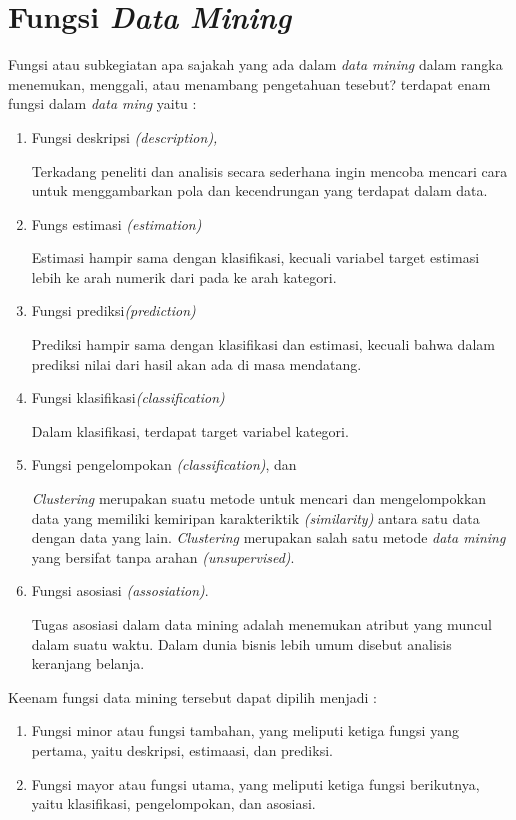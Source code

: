 \section{Fungsi \textit{Data Mining}}
\par Fungsi atau subkegiatan apa sajakah yang ada dalam \textit{data mining} dalam rangka menemukan, menggali, atau menambang pengetahuan tesebut? terdapat enam fungsi dalam \textit{data ming} yaitu : \cite{tampubolon2013implementasi}
\begin{enumerate}
    \item Fungsi deskripsi \textit{(description),}
    \par Terkadang peneliti dan analisis secara sederhana ingin mencoba mencari cara untuk menggambarkan pola dan kecendrungan yang terdapat dalam data.
     \item Fungs estimasi \textit{(estimation)}
     \par Estimasi hampir sama dengan klasifikasi, kecuali variabel target estimasi lebih ke arah numerik dari pada ke arah kategori. 
      \item Fungsi prediksi\textit{(prediction)}
      \par Prediksi hampir sama dengan klasifikasi dan estimasi, kecuali bahwa dalam prediksi nilai dari hasil akan ada di masa mendatang. 
       \item Fungsi klasifikasi\textit{(classification)}
       \par Dalam klasifikasi, terdapat target variabel kategori. 
        \item  Fungsi pengelompokan \textit{(classification)}, dan
       \par  \textit{Clustering} merupakan suatu metode untuk mencari dan mengelompokkan data yang memiliki kemiripan karakteriktik \textit{(similarity)} antara satu data dengan data yang lain. \textit{Clustering} merupakan salah satu metode \textit{data mining} yang bersifat tanpa arahan \textit{(unsupervised)}.
         \item Fungsi asosiasi \textit{(assosiation)}.
         \par Tugas asosiasi dalam data mining adalah menemukan atribut yang muncul dalam suatu waktu. Dalam dunia bisnis lebih umum disebut analisis keranjang belanja. 
\end{enumerate}
\par Keenam   fungsi data mining tersebut dapat dipilih menjadi :
  \begin{enumerate}
      \item Fungsi minor atau fungsi tambahan, yang meliputi ketiga fungsi yang pertama, yaitu deskripsi, estimaasi, dan prediksi.
       \item Fungsi mayor atau fungsi utama, yang meliputi ketiga fungsi berikutnya, yaitu klasifikasi, pengelompokan, dan asosiasi.
    \end{enumerate}
